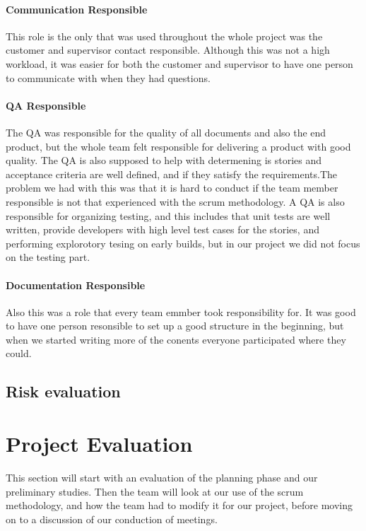 \paragraph{Communication Responsible}
This role is the only that was used throughout the whole project was the customer and supervisor contact responsible. Although this was not a high workload, it was easier for both the customer and supervisor to have one person to communicate with when they had questions.  

\paragraph{QA Responsible}
The QA was responsible for the quality of all documents and also the end product, but the whole team felt responsible for delivering a product with good quality. The QA is also supposed to help with determening is stories and acceptance criteria are well defined, and if they satisfy the requirements.The problem we had with this was that it is hard to conduct if the team member responsible is not that experienced with the scrum methodology. A QA is also responsible for organizing testing, and this includes that unit tests are well written, provide developers with high level test cases for the stories, and performing explorotory tesing on early builds, but in our project we did not focus on the testing part. 

\paragraph{Documentation Responsible}
Also this was a role that every team emmber took responsibility for. It was good to have one person resonsible to set up a good structure in the beginning, but when we started writing more of the conents everyone participated where they could. 

\subsection{Risk evaluation}
\section{Project Evaluation}
This section will start with an evaluation of the planning phase and our preliminary studies.  
Then the team will look at our use of the scrum methodology, and how the team had to modify it for our project, before moving on to a discussion of our conduction of meetings. 
